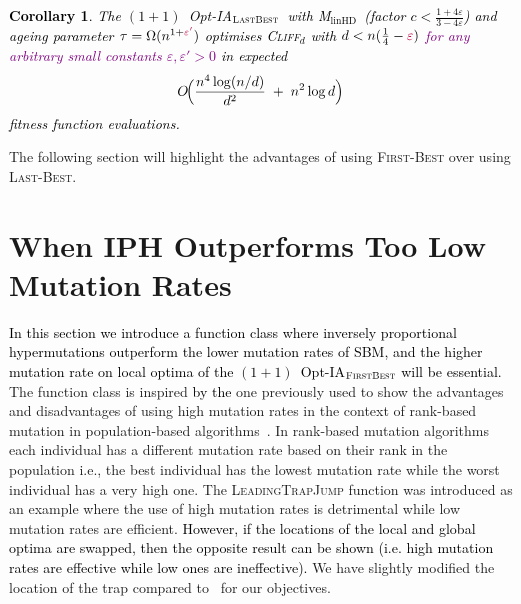 \documentclass[lettersize,journal]{IEEEtran}
\newcommand{\new}[1]{\textcolor{black}{#1}}
\newcommand{\rerev}[1]{\textcolor{purple}{#1}}
\newcommand{\rev}[1]{\textcolor{black}{#1}}
\newcommand{\cliff}{\textsc{Cliff}$_d$}
\newcommand{\linHD}{M$_{\text{linHD}}$}
\newcommand{\lastBest}{$(1+1)$~Opt-IA$_{\textsc{LastBest}}$}
\newtheorem{corollary}{Corollary}
\begin{document}
{\textcolor{black}{
\begin{corollary}
	The \textcolor{black}{\lastBest~with} \linHD\ \new{(factor $c<\tfrac{1+4\varepsilon}{3-4\varepsilon}$)} and ageing parameter $\tau=\Omega(n^{1+\rerev{\varepsilon'}})$
	optimises \cliff{} with $d<n(\tfrac{1}{4}-\rerev{\varepsilon})$ \rerev{for any arbitrary small constants $\varepsilon,\varepsilon'>0$} in expected
	\[
	O\!\Big(\frac{\rev{n^{4}}\log(n/d)}{d^{2}} \;+\; n^{2}\log d\Big)
	\]
	fitness function evaluations.
\end{corollary}
}
The following section will highlight the advantages of using \textsc{First-Best} over using \textsc{Last-Best}.
 }
 
 
 
\section{When IPH Outperforms Too Low Mutation Rates}\label{sec:ltj}
\new{In this section we introduce a function class where inversely proportional hypermutations outperform the lower mutation rates of SBM, and the higher mutation rate on local optima of the $(1+1)$~Opt-IA$_{\textsc{FirstBest}}$ will be essential.}
The function class is inspired \rev{by the} one previously used to show the advantages and disadvantages of using high mutation rates in the context of rank-based mutation in population-based algorithms~\cite{OlivetoLehreNeumann09}.
In rank-based mutation algorithms~\cite{RankBasedMutation} each individual has a different mutation rate based on their rank in the population i.e., the best individual has the lowest mutation rate while the worst individual has a very high one.
The \textsc{LeadingTrapJump} function was introduced as an example where the use of high mutation rates is detrimental while low mutation rates are efficient. \new{However, if the locations of the local and global optima are swapped, then the opposite result can be shown (i.e. high mutation rates are effective while low ones are ineffective).}
We have slightly modified the location of the trap compared to~\cite{OlivetoLehreNeumann09} for our objectives. 
\end{document}
